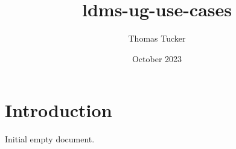 \documentclass{article}
\title{ldms-ug-use-cases}
\author{Thomas Tucker}
\date{October 2023}
\begin{document}
\section{Introduction}
Initial empty document.
\end{document}
